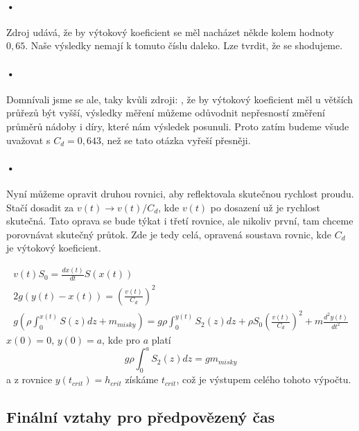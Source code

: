\documentclass[14pt,a4paper]{article}
\begin{document}
\paragraph{•}
Zdroj \cite{2} udává, že by výtokový koeficient se měl nacházet někde kolem hodnoty $0,65$. Naše výsledky nemají k tomuto číslu daleko. Lze tvrdit, že se shodujeme.
\paragraph{•}
Domnívali jsme se ale, taky kvůli zdroji: \cite{2}, že by výtokový koeficient měl u větších průřezů být vyšší, výsledky měření můžeme odůvodnit nepřesností změření průměrů nádoby i díry, které nám výsledek posunuli. Proto zatím budeme všude uvažovat s $C_d=0,643$, než se tato otázka vyřeší přesněji.
\paragraph{•}
Nyní můžeme opravit druhou rovnici, aby reflektovala skutečnou rychlost proudu. Stačí dosadit za $v(t) \rightarrow v(t)/C_d$, kde $v(t)$ po dosazení už je rychlost skutečná. Tato oprava se bude týkat i třetí rovnice, ale nikoliv první, tam chceme porovnávat skutečný průtok. Zde je tedy celá, opravená soustava rovnic, kde $C_d$ je výtokový koeficient.

\begin{gather} 
v(t)S_0=\frac{dx(t)}{dt}S(x(t))\\
2g(y(t)-x(t))=\left(\frac{v(t)}{C_d}\right)^2\\
g\left(\rho\int_{0}^{x(t)} S(z)dz+m_{misky}\right)=g \rho \int_{0}^{y(t)} S_2(z)dz+\rho S_0\left(\frac{v(t)}{C_d}\right)^2+m \frac{d^2y(t)}{dt^2}
\end{gather}
$x(0)=0$, $y(0)=a$, kde pro $a$ platí 
\begin{equation}
\label{a}
g \rho \int_{0}^{a} S_2(z)dz=gm_{misky}
\end{equation}a z rovnice $y(t_{crit})=h_{crit}$ získáme $t_{crit}$, což je výstupem celého tohoto výpočtu.
\label{Final rce}
\subsection{Finální vztahy pro předpovězený čas}
\end{document}
